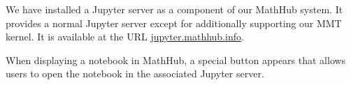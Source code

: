 We have installed a Jupyter server as a component of our MathHub system.
It provides a normal Jupyter server except for additionally supporting our MMT kernel.
It is available at the URL \url{jupyter.mathhub.info}.

When displaying a notebook in MathHub, a special button appears that allows users to open the notebook in the associated Jupyter server.




